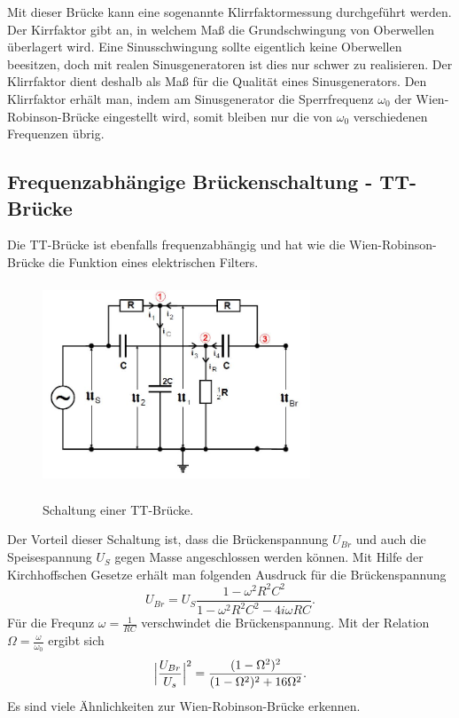 \noindent Mit dieser Brücke kann eine sogenannte Klirrfaktormessung durchgeführt werden.
Der Kirrfaktor gibt an, in welchem Maß die Grundschwingung von Oberwellen überlagert
wird. Eine Sinusschwingung sollte eigentlich keine Oberwellen beesitzen, doch mit realen
Sinusgeneratoren ist dies nur schwer zu realisieren. Der Klirrfaktor dient deshalb
als Maß für die Qualität eines Sinusgenerators.
Den Klirrfaktor erhält man, indem am Sinusgenerator die Sperrfrequenz $\omega_{0}$
der Wien-Robinson-Brücke eingestellt wird, somit bleiben nur die von $\omega_{0}$
verschiedenen Frequenzen übrig.

\subsection{Frequenzabhängige Brückenschaltung - TT-Brücke}
Die TT-Brücke ist ebenfalls frequenzabhängig und hat wie die Wien-Robinson-Brücke
die Funktion eines elektrischen Filters.

\begin{figure}[H]
  \centering
  \includegraphics[width=8cm,height=6cm]{tt.JPG}
  \caption{Schaltung einer TT-Brücke.}
  \label{fig:tt}
  \cite{skript}
\end{figure}

Der Vorteil dieser Schaltung ist, dass die Brückenspannung $U_{Br}$ und auch
die Speisespannung $U_{S}$ gegen Masse angeschlossen werden können.
Mit Hilfe der Kirchhoffschen Gesetze erhält man folgenden Ausdruck für die
Brückenspannung
\begin{equation}
  U_{Br}=U_{S}\frac{1-\omega^2 R^2C^2}{1-\omega^2 R^2C^2-4i\omega RC}.
  \label{eqn:ubr}
\end{equation}
Für die Frequnz $\omega=\frac{1}{RC}$ verschwindet die Brückenspannung. Mit der
Relation $\Omega=\frac{\omega}{\omega_{0}}$ ergibt sich
\begin{equation}
  \Bigl|\frac{U_{Br}}{U_{s}}\Bigr|^2=\frac{(1-\Omega^2)^2}{(1-\Omega^2)^2+16\Omega^2}.
\end{equation}
Es sind viele Ähnlichkeiten zur Wien-Robinson-Brücke erkennen.



\label{sec:Theorie}

